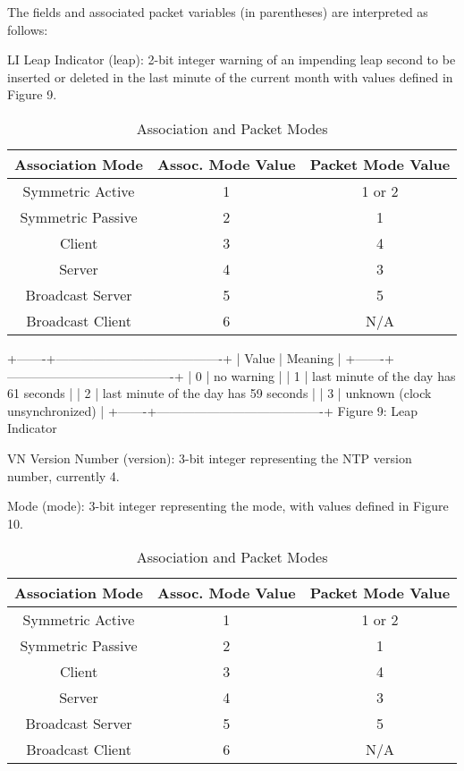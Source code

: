 The fields and associated packet variables (in parentheses) are
interpreted as follows:

LI Leap Indicator (leap): 2-bit integer warning of an impending leap
second to be inserted or deleted in the last minute of the current
month with values defined in Figure 9.

\begin{table}[htb]
\center
\begin{tabular}{c | c | c}
Association Mode & Assoc. Mode Value & Packet Mode Value \\
\hline
\hline
Symmetric Active & 1 & 1 or 2 \\
Symmetric Passive & 2 & 1 \\
Client & 3 & 4 \\
Server & 4 & 3 \\
Broadcast Server & 5 & 5 \\
Broadcast Client & 6 & N/A \\
\hline
\end{tabular}
\label{association_and_packet_modes}
\caption{Association and Packet Modes}
\end{table}

+-------+----------------------------------------+
| Value | Meaning |
+-------+----------------------------------------+
| 0 | no warning |
| 1 | last minute of the day has 61 seconds |
| 2 | last minute of the day has 59 seconds |
| 3 | unknown (clock unsynchronized) |
+-------+----------------------------------------+
Figure 9: Leap Indicator

VN Version Number (version): 3-bit integer representing the NTP
version number, currently 4.

Mode (mode): 3-bit integer representing the mode, with values defined
in Figure 10.

\begin{table}[htb]
\center
\begin{tabular}{c | c | c}
Association Mode & Assoc. Mode Value & Packet Mode Value \\
\hline
\hline
Symmetric Active & 1 & 1 or 2 \\
Symmetric Passive & 2 & 1 \\
Client & 3 & 4 \\
Server & 4 & 3 \\
Broadcast Server & 5 & 5 \\
Broadcast Client & 6 & N/A \\
\hline
\end{tabular}
\label{association_and_packet_modes}
\caption{Association and Packet Modes}
\end{table}


